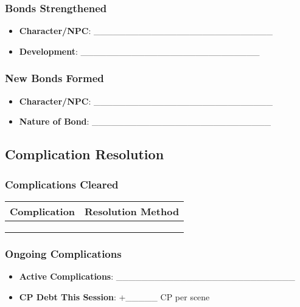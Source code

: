 \subsubsection{Bonds Strengthened}
\begin{itemize}
    \item \textbf{Character/NPC}: \_\_\_\_\_\_\_\_\_\_\_\_\_\_\_\_\_\_\_\_\_\_\_\_\_\_\_\_
    \item \textbf{Development}: \_\_\_\_\_\_\_\_\_\_\_\_\_\_\_\_\_\_\_\_\_\_\_\_\_\_\_\_
\end{itemize}

\subsubsection{New Bonds Formed}
\begin{itemize}
    \item \textbf{Character/NPC}: \_\_\_\_\_\_\_\_\_\_\_\_\_\_\_\_\_\_\_\_\_\_\_\_\_\_\_\_
    \item \textbf{Nature of Bond}: \_\_\_\_\_\_\_\_\_\_\_\_\_\_\_\_\_\_\_\_\_\_\_\_\_\_\_\_
\end{itemize}

\subsection{Complication Resolution}

\subsubsection{Complications Cleared}
\begin{tabular}{|p{5cm}|p{5cm}|}
\hline
\textbf{Complication} & \textbf{Resolution Method} \\
\hline
& \\
& \\
& \\
\hline
\end{tabular}

\subsubsection{Ongoing Complications}
\begin{itemize}
    \item \textbf{Active Complications}: \_\_\_\_\_\_\_\_\_\_\_\_\_\_\_\_\_\_\_\_\_\_\_\_\_\_\_\_
    \item \textbf{CP Debt This Session}: +\_\_\_\_\_ CP per scene
\end{itemize}

